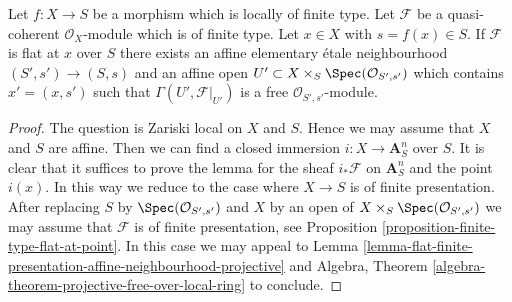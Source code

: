 \begin{lemma}
\label{lemma-flat-finite-type-affine-neighbourhood-projective}
Let $f : X \to S$ be a morphism which is locally of finite type.
Let $\mathcal{F}$ be a quasi-coherent $\mathcal{O}_X$-module which is
of finite type. Let $x \in X$ with $s = f(x) \in S$.
If $\mathcal{F}$ is flat at $x$ over $S$ there exists an affine
elementary \'etale neighbourhood $(S', s') \to (S, s)$ and
an affine open $U' \subset X \times_S \Spec(\mathcal{O}_{S', s'})$
which contains $x' = (x, s')$ such that
$\Gamma(U', \mathcal{F}|_{U'})$ is a free
$\mathcal{O}_{S', s'}$-module.
\end{lemma}

\begin{proof}
The question is Zariski local on $X$ and $S$. Hence we may assume
that $X$ and $S$ are affine. Then we can find a closed immersion
$i : X \to \mathbf{A}^n_S$ over $S$. It is clear that it suffices to
prove the lemma for the sheaf $i_*\mathcal{F}$ on $\mathbf{A}^n_S$
and the point $i(x)$. In this way we reduce to the case where $X \to S$ is
of finite presentation. After replacing $S$ by
$\Spec(\mathcal{O}_{S', s'})$ and $X$ by an open of
$X \times_S \Spec(\mathcal{O}_{S', s'})$ we may assume that
$\mathcal{F}$ is of finite presentation, see
Proposition \ref{proposition-finite-type-flat-at-point}.
In this case we may appeal to
Lemma \ref{lemma-flat-finite-presentation-affine-neighbourhood-projective}
and
Algebra, Theorem \ref{algebra-theorem-projective-free-over-local-ring}
to conclude.
\end{proof}
